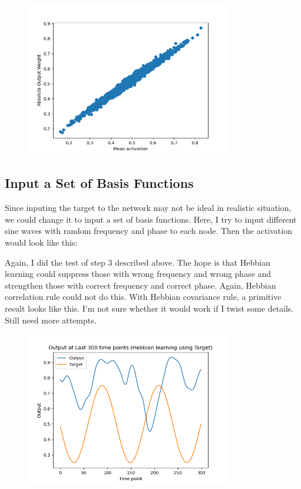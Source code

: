 \documentclass[12pt, a4paper]{article}
\begin{document}
\begin{figure}[H]
    \centering
    \includegraphics[width=0.8\textwidth]{RNN/FORCE/fig/FORCE_fbtargethebb_weightcorractv.png} \\
\end{figure}

\newpage

\subsection*{Input a Set of Basis Functions}

Since inputing the target to the network may not be ideal in realistic situation, we could change it to input a set of basis functions. Here, I try to input different sine waves with random frequency and phase to each node. Then the activation would look like this:

Again, I did the test of step 3 described above. The hope is that Hebbian learning could suppress those with wrong frequency and wrong phase and strengthen those with correct frequency and correct phase. Again, Hebbian correlation rule could not do this. With Hebbian covariance rule, a primitive result looks like this. I'm not sure whether it would work if I twist some details. Still need more attempts.

\begin{figure}[H]
    \centering
    \includegraphics[width=0.8\textwidth]{RNN/FORCE/fig/FORCE_wavebasis_outputhcp.png} \\
\end{figure}
\end{document}
